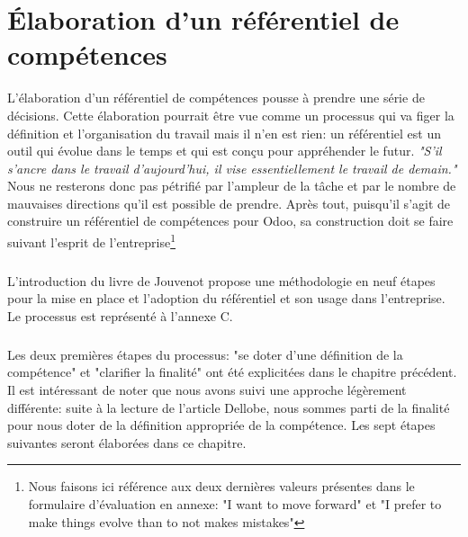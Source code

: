 \chapter{Élaboration d'un référentiel de compétences}
L'élaboration d'un référentiel de compétences pousse à prendre une série de décisions. Cette élaboration pourrait être vue comme un processus qui va figer la définition et l'organisation du travail mais il n'en est rien: un référentiel est un outil qui évolue dans le temps et qui est conçu pour appréhender le futur. \textit{"S'il s'ancre dans le travail d'aujourd'hui, il vise essentiellement le travail de demain."}\citep[pp.19]{refcompetence} Nous ne resterons donc pas pétrifié par l'ampleur de la tâche et par le nombre de mauvaises directions qu'il est possible de prendre. Après tout, puisqu'il s'agit de construire un référentiel de compétences pour Odoo, sa construction doit se faire suivant l'esprit de l'entreprise\footnote{Nous faisons ici référence aux deux dernières valeurs présentes dans le formulaire d'évaluation en annexe: "I want to move forward" et "I prefer to make things evolve than to not makes mistakes"} 

\paragraph{}L'introduction du livre de Jouvenot\citep{refcompetence} propose une méthodologie en neuf étapes pour la mise en place et l'adoption du référentiel et son usage dans l'entreprise. Le processus est représenté à l'annexe C. 

\paragraph{} Les deux premières étapes du processus: "se doter d'une définition de la compétence" et "clarifier la finalité" ont été explicitées dans le chapitre précédent. Il est intéressant de noter que nous avons suivi une approche légèrement différente: suite à la lecture de l'article Dellobe\citep{delobbe}, nous sommes parti de la finalité pour nous doter de la définition appropriée de la compétence. Les sept étapes suivantes seront élaborées dans ce chapitre.

